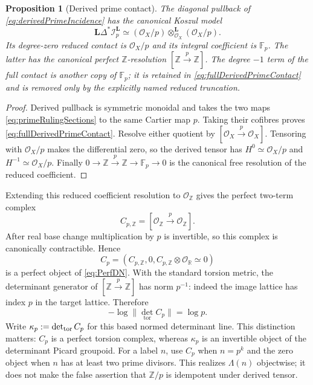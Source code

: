 \documentclass[11pt]{amsart}
\newtheorem{proposition}[theorem]{Proposition}
\theoremstyle{definition}
\theoremstyle{remark}
\newcommand{\R}{\mathbb R}
\newcommand{\Z}{\mathbb Z}
\begin{document}
\begin{proposition}[Derived prime contact]
\label{prop:derivedPrimeContact}
The diagonal pullback of \eqref{eq:derivedPrimeIncidence} has the canonical
Koszul model
\begin{equation}\label{eq:fullDerivedPrimeContact}
 \mathbf L\Delta^*\mathcal I_p^{\mathbf L}
 \simeq
 (\mathcal O_X/p)\otimes_{\mathcal O_X}^{\mathbf L}
 (\mathcal O_X/p).
\end{equation}
Its degree-zero reduced contact is $\mathcal O_X/p$ and its integral
coefficient is $\mathbb F_p$.  The latter has the canonical perfect
$\Z$-resolution $[\Z\xrightarrow p\Z]$.  The degree $-1$ term of the full
contact is another copy of $\mathbb F_p$; it is retained in
\eqref{eq:fullDerivedPrimeContact} and is removed only by the explicitly
named reduced truncation.
\end{proposition}

\begin{proof}
Derived pullback is symmetric monoidal and takes the two maps
\eqref{eq:primeRulingSections} to the same Cartier map $p$.  Taking their
cofibres proves \eqref{eq:fullDerivedPrimeContact}.  Resolve either quotient
by $[\mathcal O_X\xrightarrow p\mathcal O_X]$.  Tensoring with
$\mathcal O_X/p$ makes the differential zero, so the derived tensor has
$H^0\simeq\mathcal O_X/p$ and
$H^{-1}\simeq\mathcal O_X/p$.  Finally
$0\to\Z\xrightarrow p\Z\to\mathbb F_p\to0$ is the canonical free
resolution of the reduced coefficient.
\end{proof}

Extending this reduced coefficient resolution to $\mathcal O_{\Z}$ gives
the perfect two-term complex
\begin{equation}\label{eq:localcontact}
 C_{p,\Z}=[\mathcal O_{\Z}\xrightarrow{p}\mathcal O_{\Z}].
\end{equation}
After real base change multiplication by $p$ is invertible, so this complex
is canonically contractible.  Hence
\begin{equation}\label{eq:DNcontact}
 C_p=(C_{p,\Z},0,C_{p,\Z}\otimes\mathcal O_{\R}\simeq0)
\end{equation}
is a perfect object of \eqref{eq:PerfDN}.  With the standard torsion metric,
the determinant generator of $[\Z\xrightarrow p\Z]$ has norm $p^{-1}$:
indeed the image lattice has index $p$ in the target lattice.  Therefore
\begin{equation}\label{eq:contactmass}
 -\log\|\det_{\mathrm{tor}}C_p\|=\log p.
\end{equation}
Write $\kappa_p:=\det_{\rm tor}C_p$ for this based normed determinant
line.  This distinction matters: $C_p$ is a perfect torsion complex,
whereas $\kappa_p$ is an invertible object of the determinant Picard
groupoid.
For a label $n$, use $C_p$ when $n=p^k$ and the zero object when $n$ has at
least two prime divisors.  This realizes $\Lambda(n)$ objectwise; it does
not make the false assertion that $\Z/p$ is idempotent under derived tensor.
\end{document}
